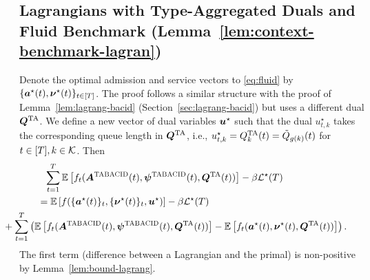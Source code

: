 \subsection{Lagrangians with Type-Aggregated Duals and Fluid Benchmark (Lemma~\ref{lem:context-benchmark-lagran})}\label{app:lem-context-benchmark-lagran}
Denote the optimal admission and service vectors to \eqref{eq:fluid} by $\{\boldsymbol{a}^\star(t),\boldsymbol{\nu}^\star(t)\}_{t \in [T]}$. The proof follows a similar structure with the proof of Lemma~\ref{lem:lagrang-bacid} (Section~\ref{sec:lagrang-bacid}) but uses a different dual $\boldsymbol{Q}^{\mathrm{TA}}$. We define a new vector of dual variables $\boldsymbol{u}^\star$ such that the dual $u^\star_{t,k}$ takes the corresponding queue length in $\boldsymbol{Q}^{\mathrm{TA}}$, i.e.,  $u^\star_{t,k} = Q^{\mathrm{TA}}_k(t) = \tilde{Q}_{g(k)}(t)$ for $t \in [T], k \in \mathcal{K}$. Then
\begin{align}
&\hspace{0.1in}\sum_{t=1}^T \expect{f_t(\bolds{A}^{\tabacid}(t),\bolds{\psi}^{\tabacid}(t),\bolds{Q}^{\ta}(t))} - \beta\set{L}^\star(T) \nonumber\\
&= \expect{f(\{\bolds{a}^\star(t)\}_t,\{\bolds{\nu}^\star(t)\}_t,\bolds{u}^\star)}-\beta\set{L}^\star(T)\label{eq:context-primary-lagrang} \\
&\hspace{-0.5in}+\sum_{t=1}^T \left(\expect{f_t(\bolds{A}^{\tabacid}(t),\bolds{\psi}^{\tabacid}(t),\bolds{Q}^{\ta}(t))} - \expect{f_t(\bolds{a}^\star(t),\bolds{\nu}^\star(t),\bolds{Q}^{\ta}(t))}\right) \label{eq:context-per-period-subopt}.
\end{align}
The first term (difference between a Lagrangian and the primal) is non-positive by Lemma~\ref{lem:bound-lagrang}. 


